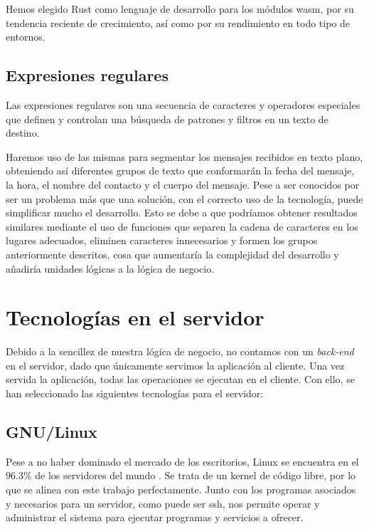 Hemos elegido Rust como lenguaje de desarrollo para los módulos \acrfull{wasm}, por su tendencia reciente de crecimiento, así como por su rendimiento en todo tipo de entornos.

\subsection{Expresiones regulares}
\label{tec_hab:regex}

Las expresiones regulares son una secuencia de caracteres y operadores especiales que definen y controlan una búsqueda de patrones y filtros en un texto de destino.

Haremos uso de las mismas para segmentar los mensajes recibidos en texto plano, obteniendo así diferentes grupos de texto que conformarán la fecha del mensaje, la hora, el nombre del contacto y el cuerpo del mensaje. Pese a ser conocidos por ser un problema más que una solución, con el correcto uso de la tecnología, puede simplificar mucho el desarrollo. Esto se debe a que podríamos obtener resultados similares mediante el uso de funciones que separen la cadena de caracteres en los lugares adecuados, eliminen caracteres innecesarios y formen los grupos anteriormente descritos, cosa que aumentaría la complejidad del desarrollo y añadiría unidades lógicas a la lógica de negocio.


\section{Tecnologías en el servidor}
\label{tec_hab:server}

Debido a la sencillez de nuestra lógica de negocio, no contamos con un \textit{back-end} en el servidor, dado que únicamente servimos la aplicación al cliente. Una vez servida la aplicación, todas las operaciones se ejecutan en el cliente. Con ello, se han seleccionado las siguientes tecnologías para el servidor:



\subsection{GNU/Linux}
\label{tec_hab:linux}

Pese a no haber dominado el mercado de los escritorios, Linux se encuentra en el $96.3\%$ de los servidores del mundo \cite{linuxMarketShare}. Se trata de un kernel de código libre, por lo que se alinea con este trabajo perfectamente. Junto con los programas asociados y necesarios para un servidor, como puede ser \acrshort{ssh}, nos permite operar y administrar el sistema para ejecutar programas y servicios a ofrecer.


